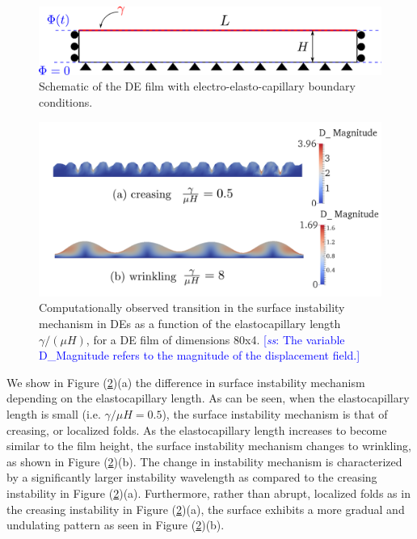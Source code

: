 \documentclass[final,authoryear,3p,times]{elsarticle}
\newcommand{\hsp}[1]{\textcolor{blue}{[\textit{ss}: #1]}}
\begin{document}
\begin{figure} \begin{center} 
\includegraphics[scale=0.6]{pics/film.pdf}
\caption{Schematic of the DE film with electro-elasto-capillary boundary conditions.}
\label{film} \end{center} \end{figure}

\begin{figure} \begin{center} 
\includegraphics[scale=0.35]{pics/wrinkcreas.pdf}
\caption{Computationally observed transition in the surface instability mechanism in DEs as a function of the elastocapillary length $\gamma/(\mu H)$, for a DE film of dimensions 80x4.  \hsp{The variable D_Magnitude refers to the magnitude of the displacement field.}}
\label{wrinkcreas} \end{center} \end{figure}

We show in Figure (\ref{wrinkcreas})(a) the difference in surface instability mechanism depending on the elastocapillary length.  As can be seen, when the elastocapillary length is small (i.e. $\gamma/\mu H=0.5$), the surface instability mechanism is that of creasing, or localized folds.  As the elastocapillary length increases to become similar to the film height, the surface instability mechanism changes to wrinkling, as shown in Figure (\ref{wrinkcreas})(b).  The change in instability mechanism is characterized by a significantly larger instability wavelength as compared to the creasing instability in Figure (\ref{wrinkcreas})(a).  Furthermore, rather than abrupt, localized folds as in the creasing instability in Figure (\ref{wrinkcreas})(a), the surface exhibits a more gradual and undulating pattern as seen in Figure (\ref{wrinkcreas})(b).  
\end{document}

